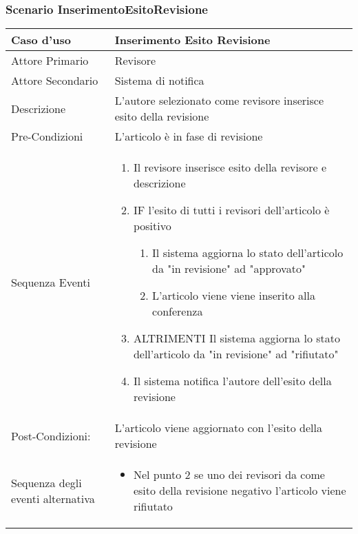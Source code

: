 \subsubsection{Scenario InserimentoEsitoRevisione}
\begin{tabular}{|p{3cm}|p{7cm}|}
\hline 
\rowcolor{Orchid}
Caso d'uso & Inserimento Esito Revisione\\
\hline
Attore Primario & Revisore\\
\hline
Attore Secondario & Sistema di notifica\\
\hline
Descrizione & L'autore selezionato come revisore inserisce esito della revisione\\
\hline
Pre-Condizioni& L'articolo è in fase di revisione\\
\hline
  Sequenza Eventi&
                   \begin{enumerate}
                   \item Il revisore inserisce esito della revisore e descrizione
                   \item IF l'esito di tutti i revisori dell'articolo è positivo
                   \begin{enumerate}
                    \item Il sistema aggiorna lo stato dell'articolo da "in revisione" ad "approvato" 
                    \item L'articolo viene viene inserito alla conferenza
                   \end{enumerate}
                   \item ALTRIMENTI Il sistema aggiorna lo stato dell'articolo da "in revisione" ad "rifiutato"
                   \item Il sistema notifica l'autore dell'esito della revisione
                   \end{enumerate}\\
\hline
Post-Condizioni: & L'articolo viene aggiornato con l'esito della revisione\\
\hline
Sequenza degli eventi alternativa & \begin{itemize}
  \item Nel punto 2 se uno dei revisori da come esito della revisione negativo l'articolo viene rifiutato
\end{itemize} \\
\hline
\end{tabular}


